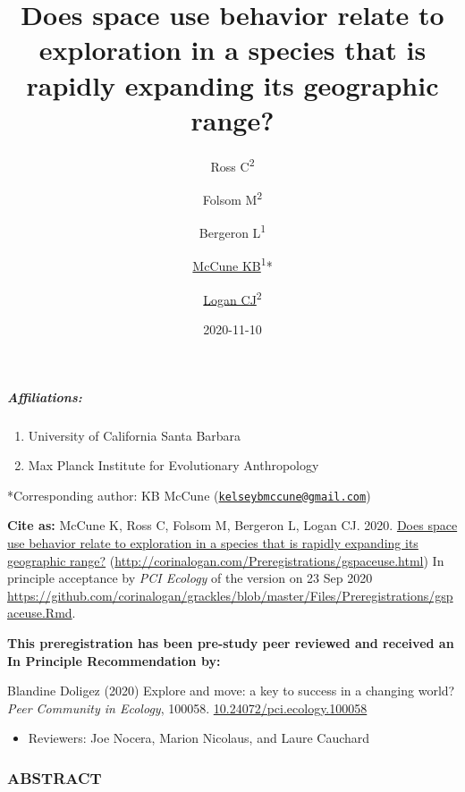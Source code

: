 \documentclass[
]{article}
\title{Does space use behavior relate to exploration in a species that is
rapidly expanding its geographic range?}
\author{Ross C\textsuperscript{2} \and Folsom M\textsuperscript{2} \and Bergeron L\textsuperscript{1} \and \href{https://www.kelseymccune.com/}{McCune KB}\textsuperscript{1}* \and \href{http://CorinaLogan.com}{Logan CJ}\textsuperscript{2}}
\date{2020-11-10}
\providecommand{\tightlist}{%
  \setlength{\itemsep}{0pt}\setlength{\parskip}{0pt}}
\begin{document}
\maketitle

\hypertarget{affiliations}{%
\subparagraph{Affiliations:}\label{affiliations}}

\begin{enumerate}
\def\labelenumi{\arabic{enumi})}
\tightlist
\item
  University of California Santa Barbara
\item
  Max Planck Institute for Evolutionary Anthropology
\end{enumerate}

*Corresponding author: KB McCune
(\href{mailto:kelseybmccune@gmail.com}{\nolinkurl{kelseybmccune@gmail.com}})

\textbf{Cite as:} McCune K, Ross C, Folsom M, Bergeron L, Logan CJ.
2020. \href{http://corinalogan.com/Preregistrations/gspaceuse.html}{Does
space use behavior relate to exploration in a species that is rapidly
expanding its geographic range?}
(\url{http://corinalogan.com/Preregistrations/gspaceuse.html}) In
principle acceptance by \emph{PCI Ecology} of the version on 23 Sep 2020
\url{https://github.com/corinalogan/grackles/blob/master/Files/Preregistrations/gspaceuse.Rmd}.

\textbf{This preregistration has been pre-study peer reviewed and
received an In Principle Recommendation by:}

Blandine Doligez (2020) Explore and move: a key to success in a changing
world? \emph{Peer Community in Ecology}, 100058.
\href{https://doi.org/10.24072/pci.ecology.100058}{10.24072/pci.ecology.100058}

\begin{itemize}
\tightlist
\item
  Reviewers: Joe Nocera, Marion Nicolaus, and Laure Cauchard
\end{itemize}

\hypertarget{abstract}{%
\subsubsection{ABSTRACT}\label{abstract}}
\end{document}
